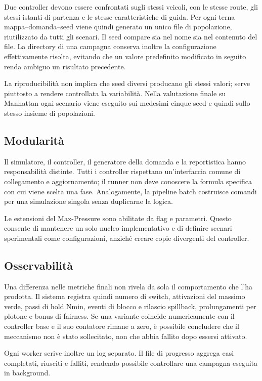 \documentclass[12pt,a4paper,oneside]{report}
\numberwithin{equation}{chapter}
\begin{document}
Due controller devono essere confrontati sugli stessi veicoli, con le stesse
route, gli stessi istanti di partenza e le stesse caratteristiche di guida. Per
ogni terna mappa--domanda--seed viene quindi generato un unico file di popolazione,
riutilizzato da tutti gli scenari. Il seed compare sia nel nome sia nel
contenuto del file. La directory di una campagna conserva inoltre la
configurazione effettivamente risolta, evitando che un valore predefinito
modificato in seguito renda ambiguo un risultato precedente.

La riproducibilità non implica che seed diversi producano gli stessi valori;
serve piuttosto a rendere controllata la variabilità. Nella valutazione finale
su Manhattan ogni scenario viene eseguito sui medesimi cinque seed e quindi
sullo stesso insieme di popolazioni.

\subsection{Modularità}

Il simulatore, il controller, il generatore della domanda e la reportistica
hanno responsabilità distinte. Tutti i controller rispettano un'interfaccia
comune di collegamento e aggiornamento; il runner non deve conoscere la formula
specifica con cui viene scelta una fase. Analogamente, la pipeline batch
costruisce comandi per una simulazione singola senza duplicarne la logica.

Le estensioni del Max-Pressure sono abilitate da flag e parametri. Questo
consente di mantenere un solo nucleo implementativo e di definire scenari
sperimentali come configurazioni, anziché creare copie divergenti del
controller.

\subsection{Osservabilità}

Una differenza nelle metriche finali non rivela da sola il comportamento che
l'ha prodotta. Il sistema registra quindi numero di switch, attivazioni del
massimo verde, passi di hold Nmin, eventi di blocco e rilascio spillback,
prolungamenti per plotone e bonus di fairness. Se una variante coincide
numericamente con il controller base e il suo contatore rimane a zero, è
possibile concludere che il meccanismo non è stato sollecitato, non che abbia
fallito dopo essersi attivato.

Ogni worker scrive inoltre un log separato. Il file di progresso aggrega casi
completati, riusciti e falliti, rendendo possibile controllare una campagna
eseguita in background.
\end{document}
